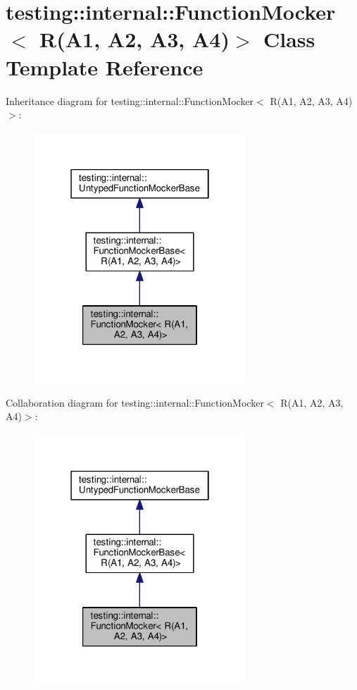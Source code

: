 \hypertarget{classtesting_1_1internal_1_1FunctionMocker_3_01R_07A1_00_01A2_00_01A3_00_01A4_08_4}{}\section{testing\+:\+:internal\+:\+:Function\+Mocker$<$ R(A1, A2, A3, A4)$>$ Class Template Reference}
\label{classtesting_1_1internal_1_1FunctionMocker_3_01R_07A1_00_01A2_00_01A3_00_01A4_08_4}


Inheritance diagram for testing\+:\+:internal\+:\+:Function\+Mocker$<$ R(A1, A2, A3, A4)$>$\+:\nopagebreak
\begin{figure}[H]
\begin{center}
\leavevmode
\includegraphics[width=226pt]{classtesting_1_1internal_1_1FunctionMocker_3_01R_07A1_00_01A2_00_01A3_00_01A4_08_4__inherit__graph}
\end{center}
\end{figure}


Collaboration diagram for testing\+:\+:internal\+:\+:Function\+Mocker$<$ R(A1, A2, A3, A4)$>$\+:\nopagebreak
\begin{figure}[H]
\begin{center}
\leavevmode
\includegraphics[width=226pt]{classtesting_1_1internal_1_1FunctionMocker_3_01R_07A1_00_01A2_00_01A3_00_01A4_08_4__coll__graph}
\end{center}
\end{figure}
